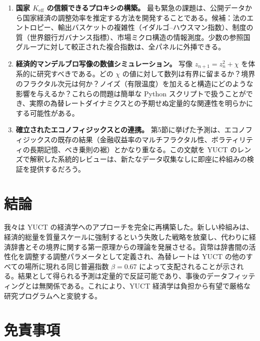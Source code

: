 \documentclass[12pt,a4paper]{article}
\theoremstyle{remark}
\begin{document}
	\begin{enumerate}[label=(\roman*)]
		\item \textbf{国家 \(K_{\mathrm{eff}}\) の信頼できるプロキシの構築。} 最も緊急の課題は、公開データから国家経済の調整効率を推定する方法を開発することである。候補：法のエントロピー、輸出バスケットの複雑性（イダルゴ–ハウスマン指数）、制度の質（世界銀行ガバナンス指標）、市場ミクロ構造の情報測度。少数の参照国グループに対して較正された複合指数は、全パネルに外挿できる。
		
		\item \textbf{経済的マンデルブロ写像の数値シミュレーション。} 写像 \(z_{n+1} = z_n^2 + \chi\) を体系的に研究すべきである。どの \(\chi\) の値に対して数列は有界に留まるか？境界のフラクタル次元は何か？ノイズ（有限温度）を加えると構造にどのような影響を与えるか？これらの問題は簡単な Python スクリプトで扱うことができ、実際の為替レートダイナミクスとの予期せぬ定量的な関連性を明らかにする可能性がある。
		
		\item \textbf{確立されたエコノフィジックスとの連携。} 第5節に挙げた予測は、エコノフィジックスの既存の結果（金融収益率のマルチフラクタル性、ボラティリティの長期記憶、べき乗則の裾）とかなり重なる。この文献を YUCT のレンズで解釈した系統的レビューは、新たなデータ収集なしに即座に枠組みの検証を提供するだろう。
	\end{enumerate}
	
	\section{結論}
	
	我々は YUCT の経済学へのアプローチを完全に再構築した。新しい枠組みは、経済的総量を質量スケールに強制するという失敗した戦略を放棄し、代わりに経済辞書とその境界に関する第一原理からの理論を発展させる。貨幣は辞書間の活性化を調整する調整パラメータとして定義され、為替レートは YUCT の他のすべての場所に現れる同じ普遍指数 \(\beta = 0.67\) によって支配されることが示される。結果として得られる予測は定量的で反証可能であり、事後のデータフィッティングとは無関係である。これにより、YUCT 経済学は負担から有望で厳格な研究プログラムへと変貌する。
	
	\section*{免責事項}
	
\end{document}
